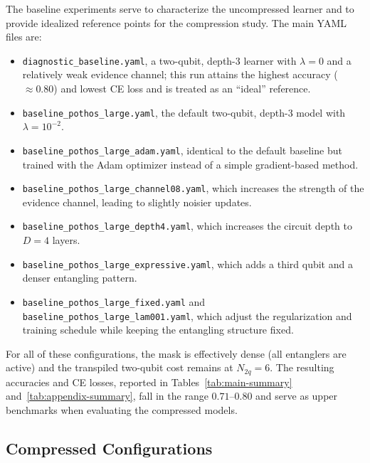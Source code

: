\documentclass[conference]{IEEEtran}
\begin{document}
The baseline experiments serve to characterize the uncompressed learner and to provide idealized reference points for the compression study. The main YAML files are:
\begin{itemize}
    \item \texttt{diagnostic\_baseline.yaml}, a two-qubit, depth-3 learner with $\lambda=0$ and a relatively weak evidence channel; this run attains the highest accuracy ($\approx 0.80$) and lowest CE loss and is treated as an ``ideal'' reference.
    \item \texttt{baseline\_pothos\_large.yaml}, the default two-qubit, depth-3 model with $\lambda=10^{-2}$.
    \item \texttt{baseline\_pothos\_large\_adam.yaml}, identical to the default baseline but trained with the Adam optimizer instead of a simple gradient-based method.
    \item \texttt{baseline\_pothos\_large\_channel08.yaml}, which increases the strength of the evidence channel, leading to slightly noisier updates.
    \item \texttt{baseline\_pothos\_large\_depth4.yaml}, which increases the circuit depth to $D=4$ layers.
    \item \texttt{baseline\_pothos\_large\_expressive.yaml}, which adds a third qubit and a denser entangling pattern.
    \item \texttt{baseline\_pothos\_large\_fixed.yaml} and \texttt{baseline\_pothos\_large\_lam001.yaml}, which adjust the regularization and training schedule while keeping the entangling structure fixed.
\end{itemize}
For all of these configurations, the mask is effectively dense (all entanglers are active) and the transpiled two-qubit cost remains at $N_{2q}=6$. The resulting accuracies and CE losses, reported in Tables~\ref{tab:main-summary} and~\ref{tab:appendix-summary}, fall in the range $0.71$--$0.80$ and serve as upper benchmarks when evaluating the compressed models.

\subsection{Compressed Configurations}
\end{document}
